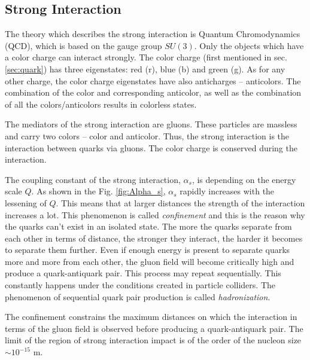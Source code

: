 \subsection{Strong Interaction}\label{sec:strong_int}

The theory which describes the strong interaction is Quantum Chromodynamics (QCD), which is based on the gauge group $SU(3)$. Only the
objects which have a color charge can interact strongly. The color charge (first mentioned in sec. \ref{sec:quark}) has three eigenstates:
red (r), blue (b) and green (g). As for any other charge, the color charge eigenstates have also anticharges -- anticolors. The combination
of the color and corresponding anticolor, as well as the combination of all the colors/anticolors results in colorless states.

The mediators of the strong interaction are gluons. These particles are massless and carry two colors -- color and anticolor. Thus, the strong 
interaction is the interaction between quarks via gluons. The color charge is conserved during the interaction.

The coupling constant of the strong interaction, $\alpha_{s}$, is depending on the energy scale $Q$. As shown in the
Fig. \ref{fig:Alpha_s}, $\alpha_{s}$ rapidly increases with the lessening of $Q$. This means that at larger distances 
the strength of the interaction increases a lot. This phenomenon is called \textit{confinement} and this is the reason why the quarks
can't exist in an isolated state. The more the quarks separate from each other in terms of distance, the stronger they interact, the harder
it becomes to separate them further. Even if enough energy is present to separate quarks more and more from each other, the gluon field will become critically
high and produce a quark-antiquark pair. This process may repeat sequentially. This constantly happens under the conditions created in
particle colliders. The phenomenon of sequential quark pair production is called \textit{hadronization}.

The confinement constrains the maximum distances on which the interaction in terms of the gluon field is observed before producing a quark-antiquark pair.
The limit of the region of strong interaction impact is of the order of the nucleon size $\sim 10^{-15}$ m.

